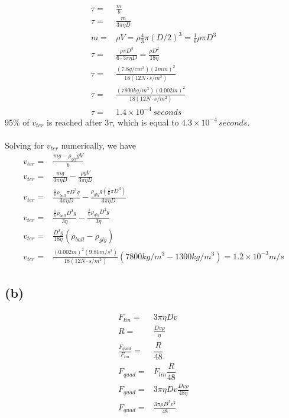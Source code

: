 \documentclass[12pt, a4paper]{article}
\begin{document}
\begin{align*}
\tau =& \frac{m}{b}
\\
\tau =& \frac{m}{3\pi\eta D}
\\
m =& \rho V = \rho \frac{4}{3}\pi (D/2)^3 = \frac{1}{6}\rho\pi D^3
\\
\tau =& \frac{\rho\pi D^3}{6 \cdot 3\pi\eta D} = \boxed{\frac{\rho D^2}{18\eta}}
\\
\tau =& \frac{(7.8g/cm^3) (2mm)^2}{18(12N\cdot s/m^2)}
\\
\tau =& \frac{(7800kg/m^3) (0.002m)^2}{18(12N\cdot s/m^2)}
\\
\tau =& \boxed{1.4\times10^{-4} \, seconds}
\end{align*}
95\% of $v_{ter}$ is reached after $3\tau$, which is equal to $\boxed{4.3\times10^{-4} \, seconds}$. \\
\\
Solving for $v_{ter}$ numerically, we have
\begin{align*}
v_{ter} =& \frac{mg - \rho_{gly} gV}{b}
\\
v_{ter} =& \frac{mg}{3\pi\eta D} - \frac{\rho gV}{3\pi\eta D}
\\
v_{ter} =& \frac{\tfrac{1}{6}\rho_{ball}\pi D^3 g}{3\pi\eta D} - \frac{\rho_{gly} g(\tfrac{1}{6}\pi D^3)}{3\pi\eta D}
\\
v_{ter} =& 
\frac{\tfrac{1}{6}\rho_{ball} D^2 g}{3\eta } - 
\frac{\tfrac{1}{6}\rho_{gly } D^2 g}{3\eta }
\\
v_{ter} =& 
\frac{D^2 g}{18\eta } (\rho_{ball}-\rho_{gly }) 
\\
v_{ter} =& 
\frac{(0.002m)^2 (9.81m/s^2)}{18(12N\cdot s/m^2) } 
(7800kg/m^3 - 1300kg/m^3) = \boxed{1.2\times10^{-3}m/s}
\end{align*}
\subsection*{(b)}
\begin{align*}
F_{lin} =& 3\pi \eta D v
\\
R =& \frac{Dv\rho}{\eta}
\\
\frac{F_{quad}}{F_{lin}} =& \dfrac{R}{48}
\\
F_{quad} =& F_{lin}\dfrac{R}{48}
\\
F_{quad} =& 3\pi \eta D v \frac{Dv\rho}{48\eta}
\\
F_{quad} =&  \boxed{\frac{3\pi\rho D^2v^2}{48}}
\end{align*}
\end{document}
